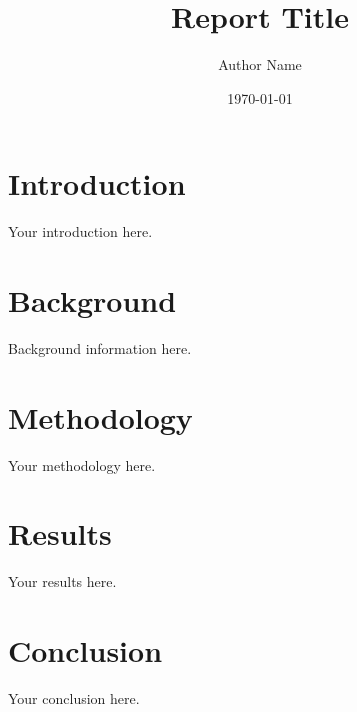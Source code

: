 \documentclass[12pt]{report}
\title{Report Title}
\author{Author Name}
\date{\today}
\begin{document}
\maketitle
\tableofcontents

\chapter{Introduction}
Your introduction here.

\chapter{Background}
Background information here.

\chapter{Methodology}
Your methodology here.

\chapter{Results}
Your results here.

\chapter{Conclusion}
Your conclusion here.
\end{document}
